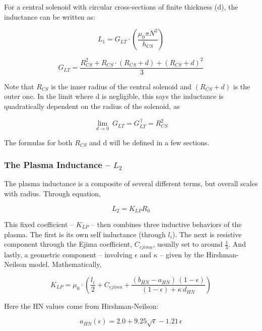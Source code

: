 For a central solenoid with circular cross-sections of finite thickness (d), the inductance can be written as:

\begin{equation}
	L_1 = G_{LT} \cdot \left( \frac{\mu_0 \pi N^2}{h_{CS}} \right)
\end{equation}

\begin{equation}
	G_{LT} = \frac{R_{CS}^2 + R_{CS} \cdot ( R_{CS} + d ) + ( R_{CS} + d ) ^ 2 }{3}
\end{equation}

Note that $R_{CS}$ is the inner radius of the central solenoid and $( R_{CS} + d )$ is the outer one. In the limit where d is negligible, this says the inductance is quadratically dependent on the radius of the solenoid, as

\begin{equation}
	\underset{d \to 0}{\lim} \ G_{LT} = G_{LT}^{\,\dagger} = R_{CS}^2
\end{equation}

The formulas for both $R_{CS}$ and d will be defined in a few sections.

\subsubsection{The Plasma Inductance -- $L_2$}

The plasma inductance is a composite of several different terms, but overall scales with radius. Through equation,

\begin{equation}
	L_2 = K_{LP} R_0
\end{equation}

This fixed coefficient -- $K_{LP}$ -- then combines three inductive behaviors of the plasma. The first is its own self inductance (through $l_i$). The next is resistive component through the Ejima coefficient, $C_{ejima}$, usually set to around $ \frac{1}{3}$. And lastly, a geometric component -- involving $\epsilon$ and $\kappa$ -- given by the Hirshman-Neilson model. Mathematically,

\begin{equation}
	K_{LP} = \mu_0 \cdot \left( \frac{l_i}{2} + C_{ejima} + \frac{ ( b_{HN} - a_{HN} ) \, ( 1 - \epsilon ) }{ ( 1 - \epsilon ) + \kappa \, d_{HN} } \right)
\end{equation}

Here the HN values come from Hirshman-Neilson:

\begin{equation}
	a_{HN}(\epsilon) = 2.0 + 9.25 \sqrt{\epsilon} - 1.21 \, \epsilon
\end{equation}

